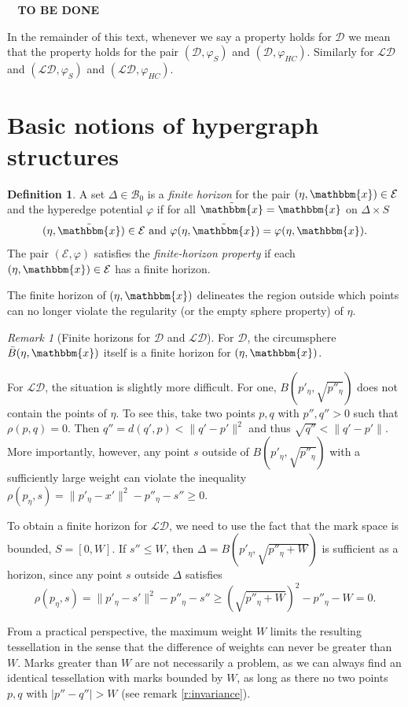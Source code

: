 \documentclass[12pt,a4paper]{article}
\theoremstyle{definition}
\newtheorem{definition}{Definition}
\theoremstyle{remark}
\newtheorem{remark}{Remark}
\theoremstyle{theorem}
\newcommand{\tbd}{\textbf{{\color{red}~ TO BE DONE ~}}}
\newcommand{\x}{\mathbbm{x}}
\begin{document}
\tbd 

In the remainder of this text, whenever we say a property holds for $\mathcal D$ we mean that the property holds for the pair $(\mathcal D,\varphi_S)$ and $(\mathcal D,\varphi_{HC})$. Similarly for $\mathcal {LD}$ and $(\mathcal {LD},\varphi_S)$ and $(\mathcal {LD}, \varphi_{HC})$.




\section{Basic notions of hypergraph structures}

\begin{definition}
A set $\Delta \in \mathcal B_0$ is a \textit{finite horizon} for the pair $(\eta,\x) \in \mathcal E$ and the hyperedge potential $\varphi$ if for all $\tilde{\x} = \x$ on $\Delta\times S$ 
$$(\eta,\tilde{\x})\in\mathcal E \text{ and } \varphi(\eta,\tilde{\x}) = \varphi(\eta,\x). $$
The pair $(\mathcal E, \varphi)$ satisfies the \textit{finite-horizon property} if each $(\eta,\x)\in \mathcal E$ has a finite horizon.
\end{definition}

The finite horizon of $(\eta,\x)$ delineates the region outside which points can no longer violate the regularity (or the empty sphere property) of $\eta$. 

\begin{remark} [Finite horizons for $\mathcal D$ and $\mathcal {LD}$]
For $\mathcal D$, the circumsphere $\bar B(\eta,\x)$ itself is a finite horizon for $(\eta,\x)$.

For $\mathcal {LD}$, the situation is slightly more difficult. For one, $B(p'_\eta, \sqrt{p''_\eta})$ does not contain the points of $\eta$. To see this, take two points $p,q$ with $p'',q''>0$ such that $\rho(p,q)=0$. Then $q'' = d(q',p) < \|q'-p'\|^2$ and thus $\sqrt{q''} < \|q'-p'\|$. More importantly, however, any point $s$ outside of $B(p'_\eta, \sqrt{p''_\eta})$ with a sufficiently large weight can violate the inequality $\rho(p_\eta,s) = \|p'_\eta - x'\|^2 - p''_\eta - s'' \geq 0$. 

To obtain a finite horizon for $\mathcal {LD}$, we need to use the fact that the mark space is bounded, $S=[0,W]$. If $s'' \leq W$, then $\Delta = B(p'_\eta, \sqrt{p''_\eta + W})$ is sufficient as a horizon, since any point $s$ outside $\Delta$ satisfies
$$\rho(p_\eta, s) = \|p'_\eta - s'\|^2 - p''_\eta - s'' \geq (\sqrt{p''_\eta+W})^2-p''_\eta-W = 0.$$ 

From a practical perspective, the maximum weight $W$ limits the resulting tessellation in the sense that the difference of weights can never be greater than $W$. Marks greater than $W$ are not necessarily a problem, as we can always find an identical tessellation with marks bounded by $W$, as long as there no two points $p,q$ with $|p''-q''|>W$ (see remark \ref{r:invariance}).
\end{remark} 
\end{document}
